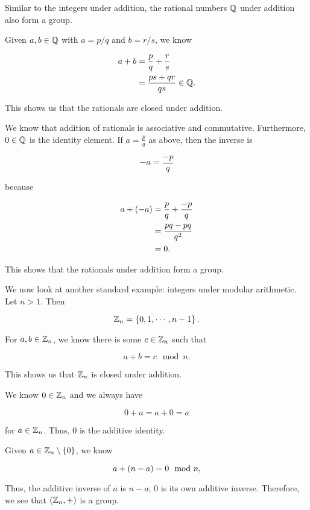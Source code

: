 \begin{example}
Similar to the integers under addition, the rational numbers $\mathbb{Q}$
under addition also form a \gls{group}.

Given $a,b\in\mathbb{Q}$ with $a = p/q$ and $b = r/s$,
we know

\begin{align}
    a + b &= \frac{p}{q} + \frac{r}{s} \nonumber\\
        &= \frac{ps + qr}{qs}\in\mathbb{Q}.
\end{align}

\noindent
This shows us that the rationals are closed under addition.

We know that addition of rationals is \gls{associative} and \gls{commutative}.
Furthermore, $0\in\mathbb{Q}$ is the identity element.
If $a = \frac{p}{q}$ as above, then the inverse is

\begin{equation}
    -a = \frac{-p}{q}
\end{equation}

\noindent
because

\begin{align}
    a + \left( -a \right) &= \frac{p}{q} + \frac{-p}{q} \nonumber\\
        &= \frac{pq - pq}{q^{2}} \nonumber\\
        &= 0.
\end{align}

\noindent
This shows that the rationals under addition form a \gls{group}.
\end{example}

\begin{example}
We now look at another standard example: integers under modular arithmetic.
Let $n > 1$.
Then

\begin{equation}
    \mathbb{Z}_{n} = \left\{ 0, 1, \cdots, n-1 \right\}.
\end{equation}

\noindent
For $a,b\in\mathbb{Z}_{n}$, we know there is some $c\in\mathbb{Z}_{n}$ such that

\begin{equation}
    a + b = c \mod n.
\end{equation}

\noindent
This shows us that $\mathbb{Z}_{n}$ is closed under addition.

We know $0\in\mathbb{Z}_{n}$ and we always have

\begin{equation}
    0 + a = a + 0 = a
\end{equation}

\noindent
for $a\in\mathbb{Z}_{n}$.
Thus, $0$ is the additive identity.

Given $a\in\mathbb{Z}_{n}\setminus\left\{ 0 \right\}$, we know

\begin{equation}
    a + \left( n-a \right) = 0 \mod n,
\end{equation}

\noindent
Thus, the additive inverse of $a$ is $n-a$;
$0$ is its own additive inverse.
Therefore, we see that $\left( \mathbb{Z}_{n},+ \right)$ is a \gls{group}.
\end{example}

